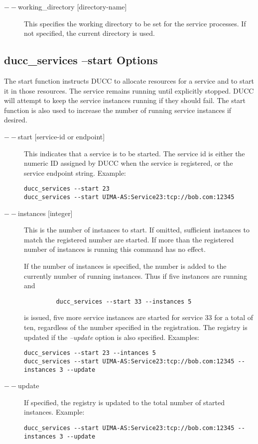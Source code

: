 \begin{description}
        \item[$--$working\_directory {[directory-name]}]
          This specifies the working directory to be set for the service processes. 
          If not specified, the current directory is used.
    \end{description}


    \subsection{ducc\_services --start Options}

    The start function instructs DUCC to allocate resources for a service and to start it in those
    resources. The service remains running until explicitly stopped. DUCC will attempt to keep the
    service instances running if they should fail. The start function is also used to increase the
    number of running service instances if desired.
    
       \begin{description}
       \item[$--$start {[service-id or endpoint]}] This indicates that a service is to be started. The service id
         is either the numeric ID assigned by DUCC when the service is registered, or the service
         endpoint string.  Example:
\begin{verbatim}
ducc_services --start 23 
ducc_services --start UIMA-AS:Service23:tcp://bob.com:12345 
\end{verbatim}
         
       \item[$--$instances {[integer]}] This is the number of instances to start. If omitted, sufficient
         instances to match the registered number are started. If more than the registered number of
         instances is running this command has no effect.

         If the number of instances is specified, the number is added
         to the currently number of running instances. Thus if five instances are running and
\begin{verbatim}
         ducc_services --start 33 --instances 5
\end{verbatim}
         is issued, five more service instances are started for service 33 for a total of ten,
         regardless of the number specified in the registration. The registry is updated if the
         {\em --update} option is also specified. Examples:
\begin{verbatim}
ducc_services --start 23 --intances 5 
ducc_services --start UIMA-AS:Service23:tcp://bob.com:12345 --instances 3 --update 
\end{verbatim}

       \item[$--$update]If specified, the registry is updated to the total number of started
         instances.  Example:
\begin{verbatim}
ducc_services --start UIMA-AS:Service23:tcp://bob.com:12345 --instances 3 --update 
\end{verbatim}
       \end{description}

